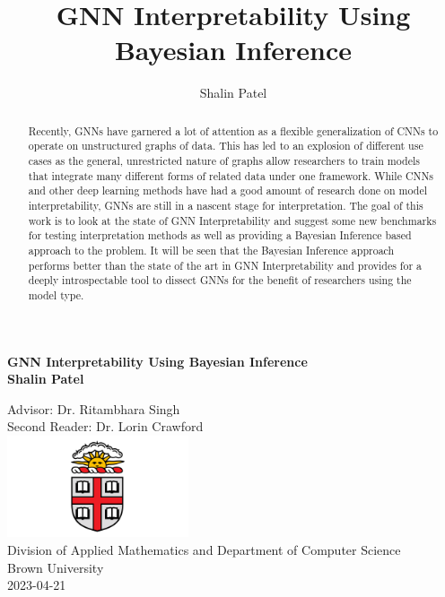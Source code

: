 \documentclass[11pt]{article}
\title{GNN Interpretability Using Bayesian Inference}
\author[1,2]{Shalin Patel}
\affil[1]{Division of Applied Mathematics, Brown University}
\affil[2]{Department of Computer Science, Brown University}
\begin{document}
\begin{titlepage}
\begin{center}
	\vspace*{1cm}
	{\Large{\textbf{GNN Interpretability Using Bayesian Inference}}} \\
	\vspace{0.5cm}
	\textbf{Shalin Patel}
	\vfill
    
    Advisor: Dr. Ritambhara Singh \\
	Second Reader: Dr. Lorin Crawford \\
	\vspace{0.8cm}
	\includegraphics[width=0.4\textwidth]{images/brown} \\
    \vspace{0.8cm}
	Division of Applied Mathematics and Department of Computer Science\\
	Brown University\\
	2023-04-21
\end{center}
\end{titlepage}

\tableofcontents
\newpage

\maketitle
\begin{abstract}
Recently, GNNs have garnered a lot of attention as a flexible generalization of CNNs to operate on unstructured graphs of data. This has led to an explosion of different use cases as the general, unrestricted nature of graphs allow researchers to train models that integrate many different forms of related data under one framework. While CNNs and other deep learning methods have had a good amount of research done on model interpretability, GNNs are still in a nascent stage for interpretation. The goal of this work is to look at the state of GNN Interpretability and suggest some new benchmarks for testing interpretation methods as well as providing a Bayesian Inference based approach to the problem. It will be seen that the Bayesian Inference approach performs better than the state of the art in GNN Interpretability and provides for a deeply introspectable tool to dissect GNNs for the benefit of researchers using the model type.
\end{abstract}









\small{}
\end{document}
